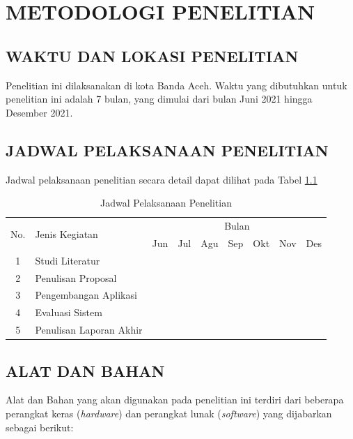 \fancyhf{} 
\fancyfoot[C]{\thepage}
\chapter{METODOLOGI PENELITIAN}

\section{\uppercase{WAKTU DAN LOKASI PENELITIAN}}
Penelitian ini dilaksanakan di kota Banda Aceh. Waktu yang dibutuhkan untuk penelitian ini adalah 7 bulan, yang dimulai dari bulan Juni 2021 hingga Desember 2021.

\section{\uppercase{JADWAL PELAKSANAAN PENELITIAN}}
Jadwal pelaksanaan penelitian secara detail dapat dilihat pada Tabel \ref{tab:jadwal}

\begin{table}[H]
	\begin{center}
	\caption{Jadwal Pelaksanaan Penelitian}
	\label{tab:jadwal}
	\begin{tabular}{|c|l|c|c|c|c|c|c|c|}
	\hline
	\multirow{2}{*}{No.}&\multirow{2}{*}{Jenis Kegiatan}&\multicolumn{7}{c|}{Bulan}\\
	\cline{3-9}
	&&Jun&Jul&Agu&Sep&Okt&Nov&Des\\
	\hline
	1&Studi Literatur&\cellcolor{gray}&\cellcolor{gray}&&&&&\\
	\hline
	2&Penulisan Proposal&&&\cellcolor{gray}&\cellcolor{gray}&&&\\
	\hline
	3&Pengembangan Aplikasi&&&\cellcolor{gray}&\cellcolor{gray}&\cellcolor{gray}&&\\
	\hline
	4&Evaluasi Sistem&&&&&&\cellcolor{gray}&\\
	\hline
	5&Penulisan Laporan Akhir&&&&&&&\cellcolor{gray}\\
	\hline
	\end{tabular}
	\end{center}
\end{table}

\section{\uppercase{ALAT DAN BAHAN}}
Alat dan Bahan yang akan digunakan pada penelitian ini terdiri dari beberapa perangkat keras (\textit{hardware}) dan perangkat lunak (\textit{software}) yang dijabarkan sebagai berikut:

